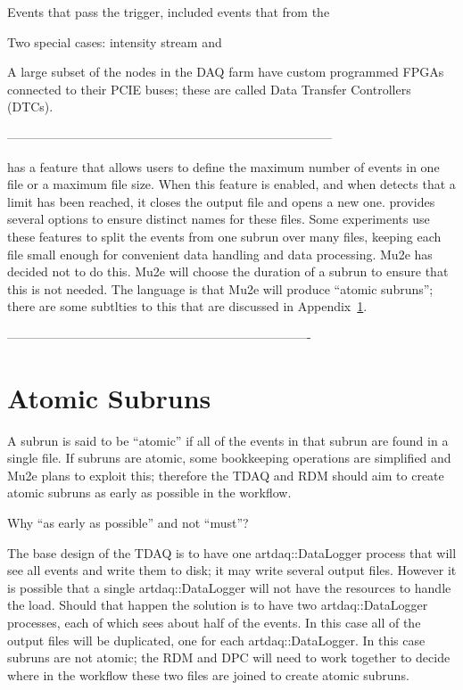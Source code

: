 Events that pass the trigger, included events that from the

Two special cases: intensity stream and 





A large subset of the nodes in the DAQ farm have custom programmed
FPGAs connected to their PCIE buses;
these are called Data Transfer Controllers (DTCs).

------------------------------------------------------------------------------


\art has a feature that allows users to define the maximum
number of events in one file or a maximum file size.
When this feature is enabled,
and when \art detects that a limit has been reached,
it closes the output file and opens a new one.
\art provides several options to ensure distinct names for these files.
Some experiments use these features to split the events from one
subrun over many files,
keeping each file small enough for convenient data handling and data processing.
Mu2e has decided not to do this.
Mu2e will choose the duration of a subrun to ensure that this is not needed.
The language is that Mu2e will produce ``atomic subruns''; there are some
subtlties to this that are discussed in Appendix~\ref{sec:AtomicSubruns}.


-------------------------------------------------------------------------
\section{Atomic Subruns}
\label{sec:AtomicSubruns}

A subrun is said to be ``atomic'' if all of the events in that subrun are found in a single \art file.
If subruns are atomic, some bookkeeping operations are simplified and Mu2e plans to exploit this;
therefore the TDAQ and RDM should aim to create atomic subruns as early as possible in the workflow.

Why ``as early as possible'' and not ``must''?

The base design of the TDAQ is to have one {\code artdaq::DataLogger} process that will
see all events and write them to disk; it may write several output files.
However it is possible that a single {\code artdaq::DataLogger} will not have the
resources to handle the load.  Should that happen the solution is to have two
{\code artdaq::DataLogger} processes, each of which sees about half of the events.
In this case all of the output files will be duplicated,
one for each {\code artdaq::DataLogger}.
In this case subruns are not atomic;
the RDM and DPC will need to work together to decide where in the workflow these two files
are joined to create atomic subruns.

